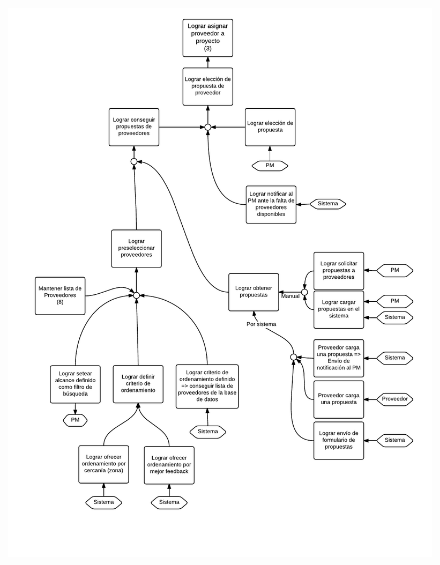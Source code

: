 \begin{figure}[H]
\includegraphics[width=\textwidth, clip=true, trim=15pt 0pt 15pt 0pt]{imagenes/objetivos/objetivos12.pdf}
\end{figure}
